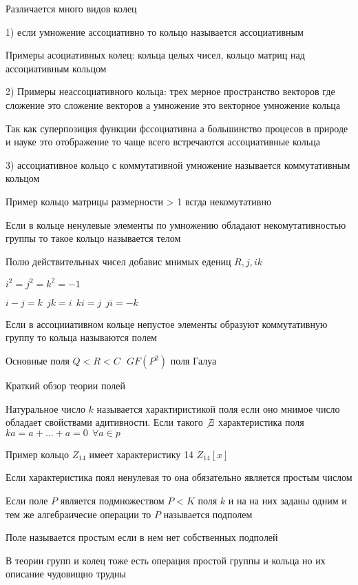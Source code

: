 Различается много видов колец

1) если умножение ассоциативно то кольцо называется ассоциативным

Примеры асоциативных колец: кольца целых чисел, кольцо матриц над ассоциативным
кольцом

2) Примеры неассоциативного кольца: трех мерное пространство векторов где
сложение это сложение векторов а умножение это векторное умножение кольца

Так как суперпозиция функции фссоциативна а большинство процесов в природе
и науке это отображение то чаще всего встречаются ассоциативные кольца

3) ассоциативное кольцо с коммутативной умножение называется коммутативным
кольцом

Пример кольцо матрицы размерности > 1 всгда некомутативно

Если в кольце ненулевые элементы по умножению обладают некомутативностью группы
то такое кольцо называется телом

Полю действительных чисел добавис мнимых едениц $R, j,ik$

$i^2 = j^2 = k^2 = -1$

$i-j=k ~~ jk=i ~~ ki = j ~~ ji = -k$

Если в ассоцииативном кольце непустое элементы образуют коммутативную группу то
кольца называются полем

Основные поля $Q<R<C ~~~ GF(P^2)$ поля Галуа

\begin{title}[\large]
  Краткий обзор теории полей
\end{title}

Натуральное число $k$ называется характиристикой поля если оно мнимое число
обладает свойствами адитивности. Если такого $\not \exists$ характеристика поля
$ka = a+ \ldots + a = 0 ~~ \forall a \in p$

Пример кольцо $Z_{14}$ имеет характеристику 14 $Z_{14}[x]$

\begin{theorem}
  Если характеристика поял ненулевая то она обязательно является простым числом
\end{theorem}

Если поле $P$ является подмножеством $P<K$ поля $k$ и на на них заданы одним и
тем же алгебраичесие операции то $P$ называется подполем

Поле называется простым если в нем нет собственных подполей

В теории групп и колец тоже есть операция простой группы и кольца но их описание
чудовищно трудны

